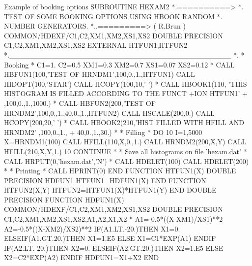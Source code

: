 \clearpage%

\begin{XMPt}{Example of booking options}
      SUBROUTINE HEXAM2
*.==========>
*.           TEST OF SOME BOOKING OPTIONS USING HBOOK RANDOM
*.           NUMBER GENERATORS.
*..=========> ( R.Brun )
      COMMON/HDEXF/C1,C2,XM1,XM2,XS1,XS2
      DOUBLE PRECISION C1,C2,XM1,XM2,XS1,XS2
      EXTERNAL HTFUN1,HTFUN2
*.___________________________________________
*.
*             Booking
*
      C1=1.
      C2=0.5
      XM1=0.3
      XM2=0.7
      XS1=0.07
      XS2=0.12
*
      CALL HBFUN1(100,'TEST OF HRNDM1',100,0.,1.,HTFUN1)
      CALL HIDOPT(100,'STAR')
      CALL HCOPY(100,10,' ')
*
      CALL HBOOK1(110,  'THIS HISTOGRAM IS FILLED ACCORDING TO THE FUNCT
     +ION HTFUN1'
     +  ,100,0.,1.,1000.)
*
      CALL HBFUN2(200,'TEST OF HRNDM2',100,0.,1.,40,0.,1.,HTFUN2)
      CALL HSCALE(200,0.)
      CALL HCOPY(200,20,' ')
*
      CALL HBOOK2(210,'HIST FILLED WITH HFILL AND HRNDM2' ,100,0.,1.,
     +  40,0.,1.,30.)
*
*             Filling
*
      DO 10 I=1,5000
         X=HRNDM1(100)
         CALL HFILL(110,X,0.,1.)
         CALL HRNDM2(200,X,Y)
         CALL HFILL(210,X,Y,1.)
  10  CONTINUE
*
*             Save all histograms on file 'hexam.dat'
*
      CALL HRPUT(0,'hexam.dat','N')
*
      CALL HDELET(100)
      CALL HDELET(200)
*
*             Printing
*
      CALL HPRINT(0)
      END
      FUNCTION HTFUN1(X)
      DOUBLE PRECISION HDFUN1
      HTFUN1=HDFUN1(X)
      END
      FUNCTION HTFUN2(X,Y)
      HTFUN2=HTFUN1(X)*HTFUN1(Y)
      END
      DOUBLE PRECISION FUNCTION HDFUN1(X)
      COMMON/HDEXF/C1,C2,XM1,XM2,XS1,XS2
      DOUBLE PRECISION C1,C2,XM1,XM2,XS1,XS2,A1,A2,X1,X2
*
      A1=-0.5*((X-XM1)/XS1)**2
      A2=-0.5*((X-XM2)/XS2)**2
      IF(A1.LT.-20.)THEN
         X1=0.
      ELSEIF(A1.GT.20.)THEN
         X1=1.E5
      ELSE
         X1=C1*EXP(A1)
      ENDIF
      IF(A2.LT.-20.)THEN
         X2=0.
      ELSEIF(A2.GT.20.)THEN
         X2=1.E5
      ELSE
         X2=C2*EXP(A2)
      ENDIF
      HDFUN1=X1+X2
      END
\end{XMPt}
\finalnewpage
